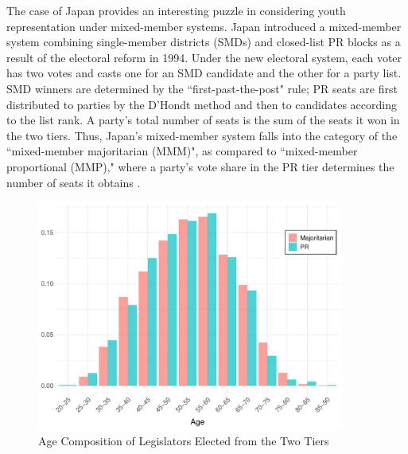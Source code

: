 \documentclass[a4paper, 11pt]{article}
\begin{document}
The case of Japan provides an interesting puzzle in considering youth representation under mixed-member systems. Japan introduced a mixed-member system combining single-member districts (SMDs) and closed-list PR blocks as a result of the electoral reform in 1994. Under the new electoral system, each voter has two votes and casts one for an SMD candidate and the other for a party list. SMD winners are determined by the ``first-past-the-post" rule; PR seats are first distributed to parties by the D'Hondt method and then to candidates according to the list rank. A party's total number of seats is the sum of the seats it won in the two tiers. Thus, Japan's mixed-member system falls into the category of the ``mixed-member majoritarian (MMM)", as compared to ``mixed-member proportional (MMP)," where a party's vote share in the PR tier determines the number of seats it obtains \citep{shugart_mixed-member_2003}. 


\begin{figure}[!htbp]
	\includegraphics[width = 0.9\textwidth]{../figure/paper/age_smd_vs_pr_winners.pdf}
	\caption{Age Composition of Legislators Elected from the Two Tiers}
	\label{fig:pr_vs_smd}
\end{figure}
\end{document}
